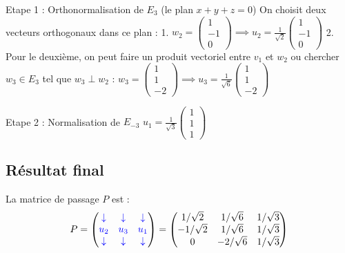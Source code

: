 \documentclass[french]{yLectureNote}
\begin{document}
Etape 1 : Orthonormalisation de $E_3$ (le plan $x+y+z=0$)
On choisit deux vecteurs orthogonaux dans ce plan :
1. $w_2 = \begin{pmatrix} 1 \\ -1 \\ 0 \end{pmatrix} \implies u_2 = \frac{1}{\sqrt{2}} \begin{pmatrix} 1 \\ -1 \\ 0 \end{pmatrix}$
2. Pour le deuxième, on peut faire un produit vectoriel entre $v_1$ et $w_2$ ou chercher $w_3 \in E_3$ tel que $w_3 \perp w_2$ :
$w_3 = \begin{pmatrix} 1 \\ 1 \\ -2 \end{pmatrix} \implies u_3 = \frac{1}{\sqrt{6}} \begin{pmatrix} 1 \\ 1 \\ -2 \end{pmatrix}$

Etape 2 : Normalisation de $E_{-3}$
$u_1 = \frac{1}{\sqrt{3}} \begin{pmatrix} 1 \\ 1 \\ 1 \end{pmatrix}$

 \subsection{Résultat final}



La matrice de passage $P$ est :
$$P = \begin{pmatrix} 
\color{blue}\downarrow & \color{blue}\downarrow & \color{blue}\downarrow \\
\color{blue}u_2 & \color{blue}u_3 & \color{blue}u_1 \\
\color{blue}\downarrow & \color{blue}\downarrow & \color{blue}\downarrow 
\end{pmatrix} = \begin{pmatrix} 
1/\sqrt{2} & 1/\sqrt{6} & 1/\sqrt{3} \\
-1/\sqrt{2} & 1/\sqrt{6} & 1/\sqrt{3} \\
0 & -2/\sqrt{6} & 1/\sqrt{3}
\end{pmatrix}$$
\end{document}
